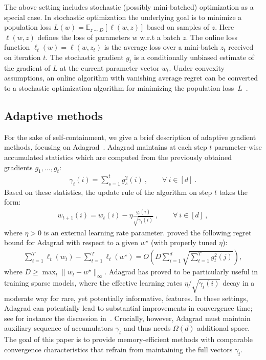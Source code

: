 \documentclass[a4paper,11pt]{article}
\newcommand{\lr}[1]{\mathopen{}\left(#1\right)}
\newcommand{\norm}[1]{\|#1\|}
\renewcommand{\O}{O}
\newcommand{\E}{\mathbb{E}}
\newcommand{\st}{\star}
\begin{document}
The above setting includes stochastic (possibly mini-batched) optimization as a
special case. In stochastic optimization the underlying goal is to minimize a
population loss $L(w) = \E_{z \sim D} [\ell(w,z)]$ based on samples of $z$. Here
$\ell(w,z)$ defines the loss of parameters $w$ w.r.t a batch $z$. The online
loss function $\ell_t(w) = \ell(w,z_t)$ is the average loss over a mini-batch
$z_t$ received on iteration $t$. The stochastic gradient $g_t$ is a
conditionally unbiased estimate of the gradient of $L$ at the current parameter
vector $w_t$. Under convexity assumptions, an online algorithm with vanishing
average regret can be converted to a stochastic optimization algorithm for
minimizing the population loss~$L$~\citep{cesa2004generalization}.


\subsection{Adaptive methods}
For the sake of self-containment, we give a brief description of adaptive
gradient methods, focusing on Adagrad~\cite{duchi2011adaptive}. Adagrad
maintains at each step $t$ parameter-wise accumulated statistics which are
computed from the previously obtained gradients $g_1,\ldots,g_t$:
\begin{align} \label{eq:accum}
  \gamma_t(i)
  =
  \sum_{s=1}^t g_s^2(i)
  ~,\qquad
  \forall ~ i \in [d]
  ~.
\end{align}
Based on these statistics, the update rule of the algorithm on step $t$ takes
the form:
\begin{align*}
  w_{t+1}(i)
  =
  w_{t}(i) - \eta \frac{g_t(i)}{\sqrt{\gamma_t(i)}}
  ~,\qquad
  \forall ~ i \in [d]
  ~,
\end{align*}
where $\eta>0$ is an external learning rate parameter.
\citet{duchi2011adaptive} proved the following regret bound for Adagrad with
respect to a given $w^\star$ (with properly tuned $\eta$):
\begin{align} \label{eq:regret-adagrad}
  \sum_{t=1}^T \ell_t(w_t) - \sum_{t=1}^T \ell_t(w^\star)
  =
  \O\lr{ D \sum_{i=1}^d \sqrt{\sum_{t=1}^T g_t^2(j)} }
  ,
\end{align}
where $D \geq \max_t \norm{w_t-w^\st}_\infty$. Adagrad has proved to be
particularly useful in training sparse models, where the effective learning
rates $\eta\big/\!\sqrt{\gamma_t(i)}$ decay in a moderate way for rare, yet
potentially informative, features. In these settings, Adagrad can potentially
lead to substantial improvements in convergence time; see for instance the
discussion in~\cite{duchi2011adaptive}. Crucially, however, Adagrad must
maintain auxiliary sequence of accumulators $\gamma_t$ and thus needs
$\Omega(d)$ additional space. The goal of this paper is to provide
memory-efficient methods with comparable convergence characteristics that
refrain from maintaining the full vectors $\gamma_t$.
\end{document}
